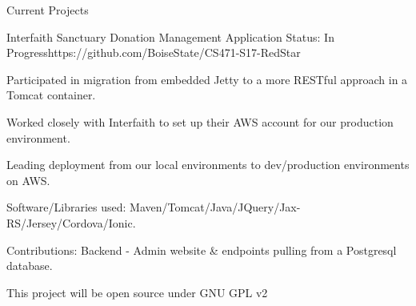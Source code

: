 \documentclass{resume}
\begin{document}
\begin{rSection}{Current Projects}

\begin{rSubsection}{Interfaith Sanctuary Donation Management Application}
{Status: In Progress}{https://github.com/BoiseState/CS471-S17-RedStar}{}
\item Participated in migration from embedded Jetty to a more RESTful approach in a Tomcat container.
\item Worked closely with Interfaith to set up their AWS account for our production environment.
\item Leading deployment from our local environments to dev/production environments on AWS.
\item Software/Libraries used: Maven/Tomcat/Java/JQuery/Jax-RS/Jersey/Cordova/Ionic.
\item Contributions: Backend - Admin website \& endpoints pulling from a Postgresql database. 
\item This project will be open source under GNU GPL v2

\end{rSubsection}

\end{rSection}


\end{document}
